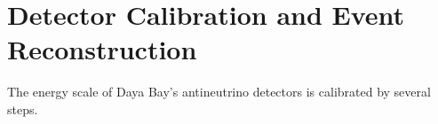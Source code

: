 \chapter{Detector Calibration and Event Reconstruction}

The energy scale of Daya Bay's antineutrino detectors is calibrated by several steps. 